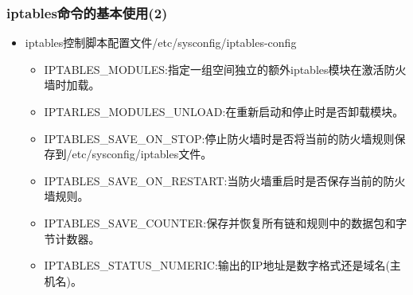 \documentclass[xcolor=svgnames,presentation]{beamer}
\begin{document}
\begin{frame}
\frametitle{iptables命令的基本使用(2)}
\label{sec-2-35}
\begin{itemize}

\item iptables控制脚本配置文件/etc/sysconfig/iptables-config
\label{sec-2-35-1}%
\begin{itemize}

\item IPTABLES\_MODULES:指定一组空间独立的额外iptables模块在激活防火墙时加载。
\label{sec-2-35-1-1}%

\item IPTARLES\_MODULES\_UNLOAD:在重新启动和停止时是否卸载模块。
\label{sec-2-35-1-2}%

\item IPTABLES\_SAVE\_ON\_STOP:停止防火墙时是否将当前的防火墙规则保存到/etc/sysconfig/iptables文件。
\label{sec-2-35-1-3}%

\item IPTABLES\_SAVE\_ON\_RESTART:当防火墙重启时是否保存当前的防火墙规则。
\label{sec-2-35-1-4}%

\item IPTABLES\_SAVE\_COUNTER:保存并恢复所有链和规则中的数据包和字节计数器。
\label{sec-2-35-1-5}%

\item IPTABLES\_STATUS\_NUMERIC:输出的IP地址是数字格式还是域名(主机名)。
\label{sec-2-35-1-6}%
\end{itemize} %
\end{itemize} %
\end{frame}
\end{document}
